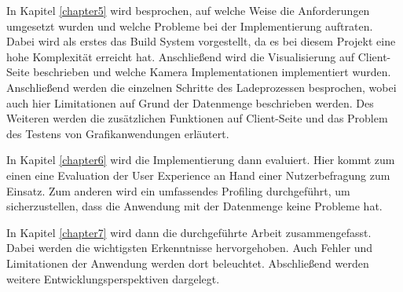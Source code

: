 In Kapitel \ref{chapter5} wird besprochen, auf welche Weise die Anforderungen umgesetzt wurden und welche Probleme bei der Implementierung auftraten. Dabei wird als erstes das Build System vorgestellt, da es bei diesem Projekt eine hohe Komplexität erreicht hat. Anschließend wird die Visualisierung auf Client-Seite beschrieben und welche Kamera Implementationen implementiert wurden. Anschließend werden die einzelnen Schritte des Ladeprozessen besprochen, wobei auch hier Limitationen auf Grund der Datenmenge beschrieben werden. Des Weiteren werden die zusätzlichen Funktionen auf Client-Seite und das Problem des Testens von Grafikanwendungen erläutert.

In Kapitel \ref{chapter6} wird die Implementierung dann evaluiert. Hier kommt zum einen eine Evaluation der User Experience an Hand einer Nutzerbefragung zum Einsatz. Zum anderen wird ein umfassendes Profiling durchgeführt, um sicherzustellen, dass die Anwendung mit der Datenmenge keine Probleme hat.

In Kapitel \ref{chapter7} wird dann die durchgeführte Arbeit zusammengefasst. Dabei werden die wichtigsten Erkenntnisse hervorgehoben. Auch Fehler und Limitationen der Anwendung werden dort beleuchtet. Abschließend werden weitere Entwicklungsperspektiven dargelegt.
